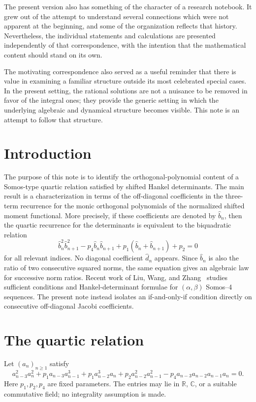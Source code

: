 \documentclass[11pt]{article}
\theoremstyle{remark}
\begin{document}
The present version also has something of the character of a research notebook. It grew out of the attempt to understand several connections which were not apparent at the beginning, and some of the organization reflects that history. Nevertheless, the individual statements and calculations are presented independently of that correspondence, with the intention that the mathematical content should stand on its own.

The motivating correspondence also served as a useful reminder that there is value in examining a familiar structure outside its most celebrated special cases. In the present setting, the rational solutions are not a nuisance to be removed in favor of the integral ones; they provide the generic setting in which the underlying algebraic and dynamical structure becomes visible. This note is an attempt to follow that structure.


\section{Introduction}
The purpose of this note is to identify the orthogonal-polynomial content of a Somos-type quartic relation satisfied by shifted Hankel determinants. The main result is a characterization in terms of the off-diagonal coefficients in the three-term recurrence for the monic orthogonal polynomials of the normalized shifted moment functional. More precisely, if these coefficients are denoted by $\widehat b_n$, then the quartic recurrence for the determinants is equivalent to the biquadratic relation
\[
\widehat b_n^2\widehat b_{n+1}^2-p_4\widehat b_n\widehat b_{n+1}
+p_1(\widehat b_n+\widehat b_{n+1})+p_2=0
\]
for all relevant indices. No diagonal coefficient $\widehat d_n$ appears. Since $\widehat b_n$ is also the ratio of two consecutive squared norms, the same equation gives an algebraic law for successive norm ratios. Recent work of Liu, Wang, and Zhang~\cite{LiuWangZhang2026} studies sufficient conditions and Hankel-determinant formulae for $(\alpha,\beta)$ Somos--4 sequences. The present note instead isolates an if-and-only-if condition directly on consecutive off-diagonal Jacobi coefficients.

\section{The quartic relation}
Let $(a_n)_{n\ge1}$ satisfy
\begin{equation}
 a_{n-3}^2a_n^2+p_1a_{n-3}a_{n-1}^3+p_1a_{n-2}^3a_n
 +p_2a_{n-2}^2a_{n-1}^2-p_4a_{n-3}a_{n-2}a_{n-1}a_n=0.
\end{equation}
Here $p_1,p_2,p_4$ are fixed parameters. The entries may lie in $\mathbb R$, $\mathbb C$, or a suitable commutative field; no integrality assumption is made.
\end{document}
